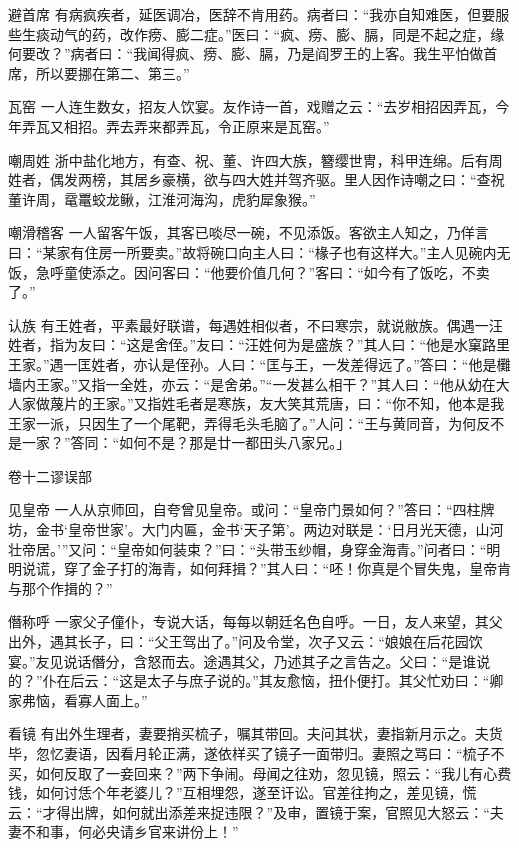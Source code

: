 \documentclass[12pt,UTF8]{ctexbook}
\begin{document}
避首席
有病疯疾者，延医调冶，医辞不肯用药。病者曰：“我亦自知难医，但要服些生痰动气的药，改作痨、膨二症。”医曰：“疯、痨、膨、膈，同是不起之症，缘何要改？”病者曰：“我闻得疯、痨、膨、膈，乃是阎罗王的上客。我生平怕做首席，所以要挪在第二、第三。”

瓦窑
一人连生数女，招友人饮宴。友作诗一首，戏赠之云：“去岁相招因弄瓦，今年弄瓦又相招。弄去弄来都弄瓦，令正原来是瓦窑。”

嘲周姓
浙中盐化地方，有查、祝、董、许四大族，簪缨世冑，科甲连绵。后有周姓者，偶发两榜，其居乡豪横，欲与四大姓并驾齐驱。里人因作诗嘲之曰：“查祝董许周，鼋鼍蛟龙鳅，江淮河海沟，虎豹犀象猴。”

嘲滑稽客
一人留客午饭，其客已啖尽一碗，不见添饭。客欲主人知之，乃佯言曰：“某家有住房一所要卖。”故将碗口向主人曰：“椽子也有这样大。”主人见碗内无饭，急呼童使添之。因问客曰：“他要价值几何？”客曰：“如今有了饭吃，不卖了。”

认族
有王姓者，平素最好联谱，每遇姓相似者，不曰寒宗，就说敝族。偶遇一汪姓者，指为友曰：“这是舍侄。”友曰：“汪姓何为是盛族？”其人曰：“他是水窠路里王家。”遇一匡姓者，亦认是侄孙。人曰：“匡与王，一发差得远了。”答曰：“他是㰙墙内王家。”又指一全姓，亦云：“是舍弟。”“一发甚么相干？”其人曰：“他从幼在大人家做蔑片的王家。”又指姓毛者是寒族，友大笑其荒唐，曰：“你不知，他本是我王家一派，只因生了一个尾靶，弄得毛头毛脑了。”人问：“王与黄同音，为何反不是一家？”答同：“如何不是？那是廿一都田头八家兄。」

卷十二谬误部

见皇帝
一人从京师回，自夸曾见皇帝。或问：“皇帝门景如何？”答曰：“四柱牌坊，金书‘皇帝世家’。大门内匾，金书‘天子第’。两边对联是：‘日月光天德，山河壮帝居。’”又问：“皇帝如何装束？”曰：“头带玉纱帽，身穿金海青。”问者曰：“明明说谎，穿了金子打的海青，如何拜揖？”其人曰：“呸！你真是个冒失鬼，皇帝肯与那个作揖的？”

僭称呼
一家父子僮仆，专说大话，每每以朝廷名色自呼。一日，友人来望，其父出外，遇其长子，曰：“父王驾出了。”问及令堂，次子又云：“娘娘在后花园饮宴。”友见说话僭分，含怒而去。途遇其父，乃述其子之言告之。父曰：“是谁说的？”仆在后云：“这是太子与庶子说的。”其友愈恼，扭仆便打。其父忙劝曰：“卿家弗恼，看寡人面上。”

看镜
有出外生理者，妻要捎买梳子，嘱其带回。夫问其状，妻指新月示之。夫货毕，忽忆妻语，因看月轮正满，遂依样买了镜子一面带归。妻照之骂曰：“梳子不买，如何反取了一妾回来？”两下争闹。母闻之往劝，忽见镜，照云：“我儿有心费钱，如何讨恁个年老婆儿？”互相埋怨，遂至讦讼。官差往拘之，差见镜，慌云：“才得出牌，如何就出添差来捉违限？”及审，置镜于案，官照见大怒云：“夫妻不和事，何必央请乡官来讲份上！”
\end{document}
